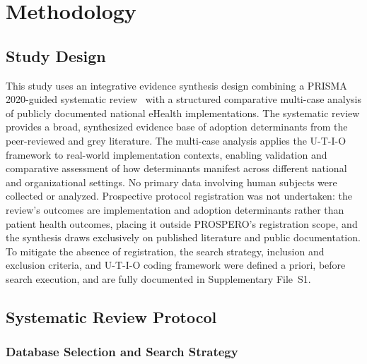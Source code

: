 \section{Methodology}

\subsection{Study Design}

This study uses an integrative evidence synthesis design combining a PRISMA 2020-guided systematic review~\cite{page2021prisma} with a structured comparative multi-case analysis of publicly documented national eHealth implementations. The systematic review provides a broad, synthesized evidence base of adoption determinants from the peer-reviewed and grey literature. The multi-case analysis applies the U-T-I-O framework to real-world implementation contexts, enabling validation and comparative assessment of how determinants manifest across different national and organizational settings. No primary data involving human subjects were collected or analyzed. Prospective protocol registration was not undertaken: the review's outcomes are implementation and adoption determinants rather than patient health outcomes, placing it outside PROSPERO's registration scope, and the synthesis draws exclusively on published literature and public documentation. To mitigate the absence of registration, the search strategy, inclusion and exclusion criteria, and U-T-I-O coding framework were defined a priori, before search execution, and are fully documented in Supplementary File~S1.

\subsection{Systematic Review Protocol}

\subsubsection{Database Selection and Search Strategy}

